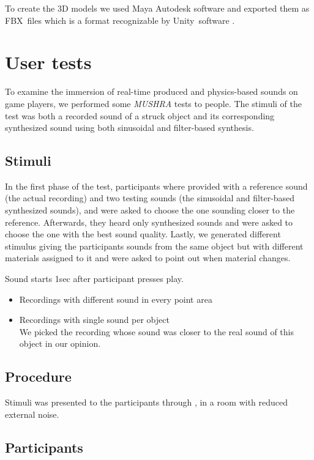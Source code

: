 To create the 3D models we used Maya Autodesk software \cite{bib:maya} and exported them as FBX\textregistered\ files \cite{bib:fbx} which is a format recognizable by Unity\textregistered\ software \cite{bib:unity}.

\section{User tests}

To examine the immersion of real-time produced and physics-based sounds on game players, we performed some \textit{MUSHRA} tests to people. The stimuli of the test was both a recorded sound of a struck object and its corresponding synthesized sound using both sinusoidal and filter-based synthesis.

\subsection{Stimuli}
In the first phase of the test, participants where provided with a reference sound (the actual recording) and two testing sounds (the sinusoidal and filter-based synthesized sounds), and were asked to choose the one sounding closer to the reference. Afterwards, they heard only synthesized sounds and were asked to choose the one with the best sound quality. Lastly, we generated different stimulus giving the participants sounds from the same object but with different materials assigned to it and were asked to point out when material changes. 


Sound starts 1sec after participant presses play.
\begin{itemize}
\item Recordings with different sound in every point area
\item Recordings with single sound per object\\
We picked the recording whose sound was closer to the real sound of this object in our opinion.\\

\end{itemize}

\subsection{Procedure}
Stimuli was presented to the participants through , in a room with reduced external noise.

\subsection{Participants}
